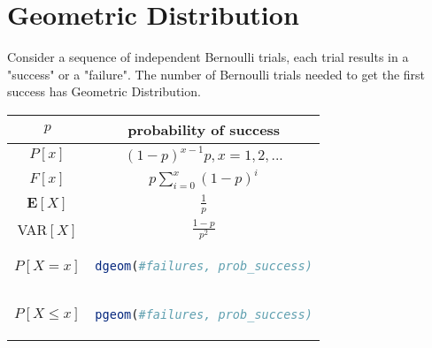 \section{Geometric Distribution}
\begin{tcolorbox}
Consider a sequence of independent Bernoulli trials, each trial results in a "success" or a "failure". The number of Bernoulli trials needed to get the first success has Geometric Distribution.
\end{tcolorbox}
\begingroup
\setlength{\tabcolsep}{10pt} %
\renewcommand{\arraystretch}{1.5} %
\begin{center}
\begin{tabular}{ |c|c| } 
\hline
\(p\) & probability of success \\ \hline
\(P[x]\) & \((1 - p)^{x-1}p, x = 1,2,...\)\\ \hline
\(F[x]\) & \(p \sum_{i = 0}^x (1 - p)^i\) \\ \hline
\(\mathbf{E}[X]\) & \(\frac{1}{p}\) \\ \hline
VAR\([X]\) & \(\frac{1-p}{p^2}\) \\ \hline\hline
\(P[X = x]\) & \begin{lstlisting}[language=R]
dgeom(#failures, prob_success)
\end{lstlisting} \\ \hline
\(P[X \leq x]\) & \begin{lstlisting}[language=R]
pgeom(#failures, prob_success)
\end{lstlisting} \\ \hline
\end{tabular}
\end{center}
\endgroup



